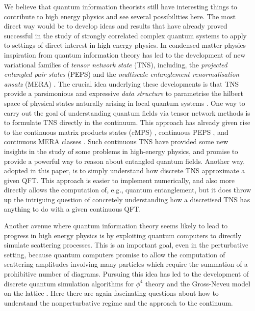 \documentclass[11pt]{amsart}
\theoremstyle{plain}%
\theoremstyle{definition}
\theoremstyle{remark}
\begin{document}
We believe that quantum information theorists still have interesting things to contribute to high energy physics and see several possibilities here. The most direct way would be to develop ideas and results that have already proved successful in the study of strongly correlated complex quantum systems to apply to settings of direct interest in high energy physics. In condensed matter physics inspiration from quantum information theory has led to the development of new variational families of \emph{tensor network state} (TNS), including, the \emph{projected entangled pair states} (PEPS) \cite{verstraete_renormalization_2004} and the \emph{multiscale entanglement renormalisation ansatz} (MERA) \cite{vidal_entanglement_2007,vidal_class_2008}. The crucial idea underlying these developments is that TNS provide a parsimonious and expressive \emph{data structure} to parametrise  the hilbert space of physical states naturally arising \cite{poulin_quantum_2011} in local quantum systems \cite{orus_practical_2014, haegeman_geometry_2014,osborne_simulating_2007,bravyi_topological_2010,bravyi_short_2011,hastings_lieb-schultz-mattis_2004,hastings_area_2007,osborne_efficient_2006}. One way to carry out the goal of understanding quantum fields via tensor network methods is to formulate TNS directly in the continuum. This approach has already given rise to the continuous matrix products states (cMPS) \cite{verstraete_continuous_2010,osborne_holographic_2010, haegeman_calculus_2013}, continuous PEPS \cite{jennings_variational_2012}, and continuous MERA classes \cite{haegeman_entanglement_2013}. Such continuous TNS have provided some new insights in the study of some problems in high-energy physics, and promise to provide a powerful way to reason about entangled quantum fields. Another way, adopted in this paper, is to simply understand how discrete TNS approximate a given QFT. This approach is easier to implement numerically, and also more directly allows the computation of, e.g., quantum entanglement, but it does throw up the intriguing question of concretely understanding how a discretised TNS has anything to do with a given continuous QFT.  

Another avenue where quantum information theory seems likely to lead to progress in high energy physics is by exploiting quantum computers to directly simulate scattering processes. This is an important goal, even in the perturbative setting, because quantum computers promise to allow the computation of scattering amplitudes involving many particles which require the summation of a prohibitive number of diagrams. Pursuing this idea has led to the development of discrete quantum simulation algorithms for $\phi^4$ theory \cite{jordan_quantum_2012,jordan_quantum_2011} and the Gross-Neveu model on the lattice \cite{jordan_quantum_2014}. Here there are again fascinating questions about how to understand the nonperturbative regime and the approach to the continuum.  
\end{document}
